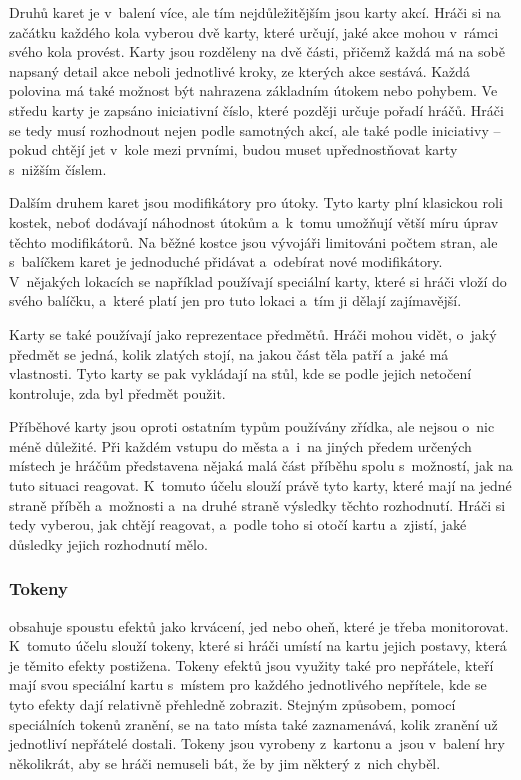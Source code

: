 Druhů karet je v~balení více, ale tím nejdůležitějším jsou karty akcí. Hráči si na začátku každého kola vyberou dvě karty, které určují, jaké akce mohou v~rámci svého kola provést. Karty jsou rozděleny na dvě části, přičemž každá má na sobě napsaný detail akce neboli jednotlivé kroky, ze kterých akce sestává. Každá polovina má také možnost být nahrazena základním útokem nebo pohybem. Ve středu karty je zapsáno iniciativní číslo, které později určuje pořadí hráčů. Hráči se tedy musí rozhodnout nejen podle samotných akcí, ale také podle iniciativy -- pokud chtějí jet v~kole mezi prvními, budou muset upřednostňovat karty s~nižším číslem.

Dalším druhem karet jsou modifikátory pro útoky. Tyto karty plní klasickou roli kostek, neboť dodávají náhodnost útokům a~k~tomu umožňují větší míru úprav těchto modifikátorů. Na běžné kostce jsou vývojáři limitováni počtem stran, ale s~balíčkem karet je jednoduché přidávat a~odebírat nové modifikátory. V~nějakých lokacích se například používají speciální karty, které si hráči vloží do svého balíčku, a~které platí jen pro tuto lokaci a~tím ji dělají zajímavější.

Karty se také používají jako reprezentace předmětů. Hráči mohou vidět, o~jaký předmět se jedná, kolik zlatých stojí, na jakou část těla patří a~jaké má vlastnosti. Tyto karty se pak vykládají na stůl, kde se podle jejich netočení kontroluje, zda byl předmět použit.

Příběhové karty jsou oproti ostatním typům používány zřídka, ale nejsou o~nic méně důležité. Při každém vstupu do města a~i~na jiných předem určených místech je hráčům představena nějaká malá část příběhu spolu s~možností, jak na tuto situaci reagovat. K~tomuto účelu slouží právě tyto karty, které mají na jedné straně příběh a~možnosti a~na druhé straně výsledky těchto rozhodnutí. Hráči si tedy vyberou, jak chtějí reagovat, a~podle toho si otočí kartu a~zjistí, jaké důsledky jejich rozhodnutí mělo.

\subsubsection*{Tokeny}
\label{subsubsec:gh_comp_tokens}

 obsahuje spoustu efektů jako krvácení, jed nebo oheň, které je třeba monitorovat. K~tomuto účelu slouží tokeny, které si hráči umístí na kartu jejich postavy, která je těmito efekty postižena. Tokeny efektů jsou využity také pro nepřátele, kteří mají svou speciální kartu s~místem pro každého jednotlivého nepřítele, kde se tyto efekty dají relativně přehledně zobrazit. Stejným způsobem, pomocí speciálních tokenů zranění, se na tato místa také zaznamenává, kolik zranění už jednotliví nepřátelé dostali. Tokeny jsou vyrobeny z~kartonu a~jsou v~balení hry několikrát, aby se hráči nemuseli bát, že by jim některý z~nich chyběl.

